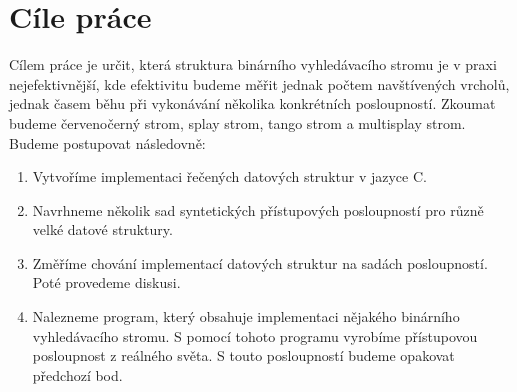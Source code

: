 
\chapter{Cíle práce}

Cílem práce je určit, která struktura binárního vyhledávacího stromu je v praxi nejefektivnější, kde efektivitu budeme měřit jednak počtem navštívených vrcholů, jednak časem běhu při vykonávání několika konkrétních posloupností. Zkoumat budeme červenočerný strom, splay strom, tango strom a multisplay strom. Budeme postupovat následovně:

\begin{enumerate}
\item Vytvoříme implementaci řečených datových struktur v jazyce C.
\item Navrhneme několik sad syntetických přístupových posloupností pro různě velké datové struktury.
\item Změříme chování implementací datových struktur na sadách posloupností. Poté provedeme diskusi.
\item Nalezneme program, který obsahuje implementaci nějakého binárního vyhledávacího stromu. S pomocí tohoto programu vyrobíme přístupovou posloupnost z reálného světa. S touto posloupností budeme opakovat předchozí bod.
\end{enumerate}
